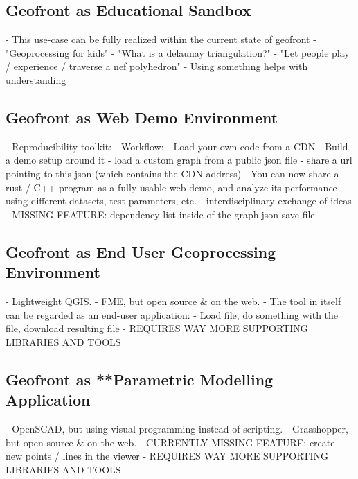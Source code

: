 








\subsection{Geofront as Educational Sandbox}
- This use-case can be fully realized within the current state of geofront
- "Geoprocessing for kids"
- "What is a delaunay triangulation?" 
- "Let people play / experience / traverse a nef polyhedron"
- Using something helps with understanding

\subsection{Geofront as Web Demo Environment}
- Reproducibility toolkit:
- Workflow: 
  - Load your own code from a CDN
  - Build a demo setup around it
  - load a custom graph from a public json file
  - share a url pointing to this json (which contains the CDN address)
- You can now share a rust / C++ program as a fully usable web demo,   
  and analyze its performance using different datasets, test parameters, etc. 
- interdisciplinary exchange of ideas
- MISSING FEATURE: dependency list inside of the graph.json save file

\subsection{Geofront as End User Geoprocessing Environment}
- Lightweight QGIS.
- FME, but open source \& on the web.
- The tool in itself can be regarded as an end-user application:
  - Load file, do something with the file, download resulting file
  - REQUIRES WAY MORE SUPPORTING LIBRARIES AND TOOLS

\subsection{Geofront as **Parametric Modelling Application}
  - OpenSCAD, but using visual programming instead of scripting.
  - Grasshopper, but open source \& on the web.
  - CURRENTLY MISSING FEATURE: create new points / lines in the viewer
  - REQUIRES WAY MORE SUPPORTING LIBRARIES AND TOOLS


